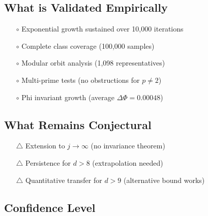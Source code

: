 \documentclass[11pt,a4paper]{article}
\theoremstyle{plain}
\theoremstyle{definition}
\begin{document}
\subsection{What is Validated Empirically}

\begin{enumerate}
\item[\textcolor{observed}{$\circ$}] Exponential growth sustained over 10,000 iterations
\item[\textcolor{observed}{$\circ$}] Complete class coverage (100,000 samples)
\item[\textcolor{observed}{$\circ$}] Modular orbit analysis (1,098 representatives)
\item[\textcolor{observed}{$\circ$}] Multi-prime tests (no obstructions for $p \neq 2$)
\item[\textcolor{observed}{$\circ$}] Phi invariant growth (average $\Delta\Phi = 0.00048$)
\end{enumerate}

\subsection{What Remains Conjectural}

\begin{enumerate}
\item[\textcolor{conjectural}{$\triangle$}] Extension to $j \to \infty$ (no invariance theorem)
\item[\textcolor{conjectural}{$\triangle$}] Persistence for $d > 8$ (extrapolation needed)
\item[\textcolor{conjectural}{$\triangle$}] Quantitative transfer for $d > 9$ (alternative bound works)
\end{enumerate}

\subsection{Confidence Level}

\begin{center}
\end{center}
\end{document}
